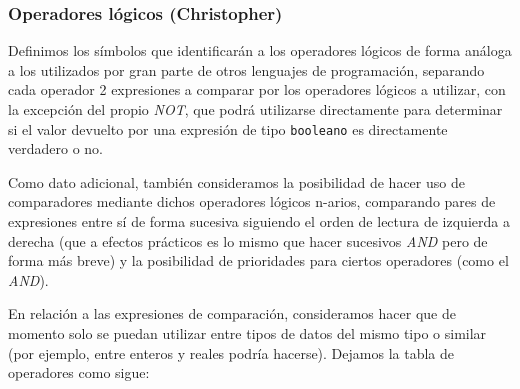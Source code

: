 \documentclass[11pt, english]{article}
\begin{document}
\subsubsection{Operadores lógicos (Christopher)}
Definimos los símbolos que identificarán a los operadores lógicos de forma análoga a los utilizados por gran parte de otros lenguajes de programación, separando cada operador 2 expresiones a comparar por los operadores lógicos a utilizar, con la excepción del propio \emph{NOT}, que podrá utilizarse directamente para determinar si el valor devuelto por una expresión de tipo \texttt{booleano} es directamente verdadero o no. 


Como dato adicional, también consideramos la posibilidad de hacer uso de comparadores mediante dichos operadores lógicos n-arios, comparando pares de expresiones entre sí de forma sucesiva siguiendo el orden de lectura de izquierda a derecha (que a efectos prácticos es lo mismo que hacer sucesivos \emph{AND} pero de forma más breve) y la posibilidad de prioridades para ciertos operadores (como el \emph{AND}). \vspace{0px}

En relación a las expresiones de comparación, consideramos hacer que de momento solo se puedan utilizar entre tipos de datos del mismo tipo o similar (por ejemplo, entre enteros y reales podría hacerse). Dejamos la tabla de operadores como sigue: \vspace{0px}
\end{document}
